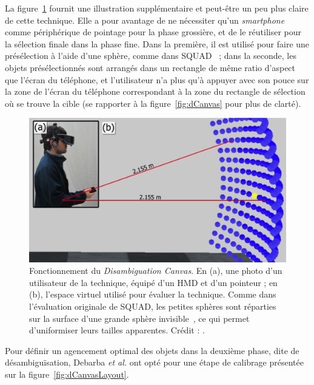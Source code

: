 	La figure~\ref{fig:dCanvas2} fournit une illustration supplémentaire et peut-être un peu plus claire de cette technique. Elle a pour avantage de ne nécessiter qu'un \emph{smartphone} comme périphérique de pointage pour la phase grossière, et de le réutiliser pour la sélection finale dans la phase fine. Dans la première, il est utilisé pour faire une présélection à l'aide d'une sphère, comme dans SQUAD~\cite{kopper2011rapid} ; dans la seconde, les objets présélectionnés sont arrangés dans un rectangle de même ratio d'aspect que l'écran du téléphone, et l'utilisateur n'a plus qu'à appuyer avec son pouce sur la zone de l'écran du téléphone correspondant à la zone du rectangle de sélection où se trouve la cible (se rapporter à la figure~\ref{fig:dCanvas} pour plus de clarté).
	
	\begin{figure}[H]
		\centering
		\includegraphics[width=\textwidth]{figures/ch2/dCanvas2}
		\caption[\emph{Disambiguation Canvas}, bis]{Fonctionnement du \emph{Disambiguation Canvas}. En (a), une photo d'un utilisateur de la technique, équipé d'un HMD et d'un pointeur ; en (b), l'espace virtuel utilisé pour évaluer la technique. Comme dans l'évaluation originale de SQUAD, les petites sphères sont réparties sur la surface d'une grande sphère invisible~\cite{kopper2011rapid}, ce qui permet d'uniformiser leurs tailles apparentes. Crédit : \cite{debarba2013disambiguation}.}
		\label{fig:dCanvas2}
	\end{figure}
	
	Pour définir un agencement optimal des objets dans la deuxième phase, dite de désambiguïsation, Debarba \emph{et al.} ont opté pour une étape de calibrage présentée sur la figure~\ref{fig:dCanvasLayout}.
	
